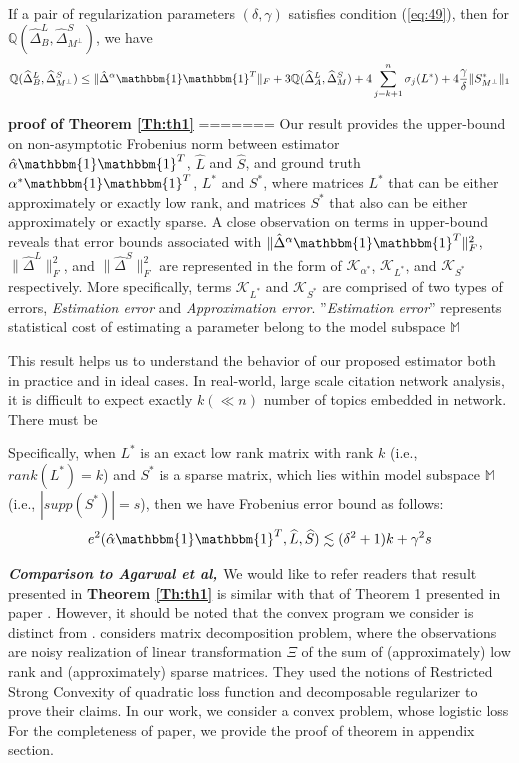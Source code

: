 \documentclass[AMS,STIX1COL]{WileyNJD-v2}
\begin{document}
\begin{lemma} \label{le:le1}
If a pair of regularization parameters $(\delta,\gamma)$ satisfies condition (\ref{eq:49}), then for $\mathbb{Q}(\widehat{\Delta}^L_{B},\widehat{\Delta}^S_{M^\perp})$, we have
\[
    \mathbb{Q}(\widehat{\Delta}^L_{B},\widehat{\Delta}^S_{M^\perp}) \leq 
    \|\hat{\Delta}^{\alpha}\mathbbm{1}\mathbbm{1}^T\|_{F} + 
    3\mathbb{Q}(\widehat{\Delta}^{L}_{A},\widehat{\Delta}^{S}_{M})+4 \sum_{j=k+1}^{n} \sigma_{j}(L^{*}) + 4\frac{\gamma}{\delta}   
    \|S^{*}_{M^\perp}\|_{1}
\]
\end{lemma}

\noindent\textbf{proof of Theorem \ref{Th:th1}}
=======
Our result provides the upper-bound on non-asymptotic Frobenius norm between estimator $\hat{\alpha}\mathbbm{1}\mathbbm{1}^T$, $\widehat{L}$ and $\widehat{S}$, and ground truth $\alpha^*\mathbbm{1}\mathbbm{1}^T$, $L^*$ and $S^*$, where matrices $L^*$ that can be either approximately or exactly low rank, and matrices $S^*$ that also can be either approximately or exactly sparse. 
A close observation on terms in upper-bound reveals that error bounds associated with $\|\hat{\Delta}^{\alpha}\mathbbm{1}\mathbbm{1}^T\|_{F}^{2}$, $\|\widehat{\Delta}^{L}\|_{F}^{2}$, and $\|\widehat{\Delta}^{S}\|_{F}^{2}$ are represented in the form of $\mathcal{K}_{\alpha^*}$, $\mathcal{K}_{L^*}$, and $\mathcal{K}_{S^*}$ respectively.
More specifically, terms $\mathcal{K}_{L^*}$ and $\mathcal{K}_{S^*}$ are comprised of two types of errors, \emph{Estimation error} and \emph{Approximation error}. ''\emph{Estimation error}'' represents statistical cost of estimating a parameter belong to the model subspace $\mathbb{M}$  

This result helps us to understand the behavior of our proposed estimator both in practice and in ideal cases.
In real-world, large scale citation network analysis, it is difficult to expect exactly $k(\ll n)$ number of topics embedded in network. There must be 


Specifically, when $L^*$ is an exact low rank matrix with rank $k$ (i.e., $rank(L^*)=k$) and $S^*$ is a sparse matrix, which lies within model subspace $\mathbb{M}$ (i.e., $|supp(S^*)|=s$), then we have Frobenius error bound as follows:
\[
    e^{2}(\hat{\alpha}\mathbbm{1}\mathbbm{1}^T,\widehat{L},\widehat{S}) \lesssim (\delta^2+1)k+\gamma^2s
\]


\emph{\textbf{Comparison to Agarwal et al, \cite{agarwal2012noisy}}}
We would like to refer readers that result presented in \textbf{Theorem \ref{Th:th1}} is similar with that of Theorem 1 presented in paper \cite{agarwal2012noisy}. 
However, it should be noted that the convex program we consider is distinct from \cite{agarwal2012noisy}.
\cite{agarwal2012noisy} considers matrix decomposition problem, where the observations are noisy realization of linear transformation $\Xi$ of the sum of (approximately) low rank and (approximately) sparse matrices. 
They used the notions of Restricted Strong Convexity of quadratic loss function and decomposable regularizer to prove their claims. In our work, we consider a convex problem, whose logistic loss 
For the completeness of paper, we provide the proof of theorem in appendix section.
\end{document}
